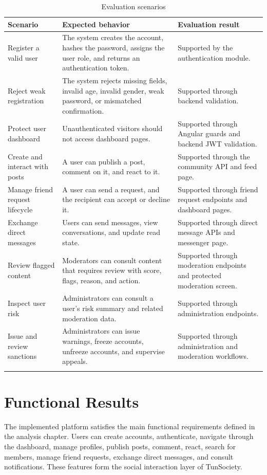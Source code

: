 \begin{longtable}{|m{3.8cm}|m{5.2cm}|m{5.2cm}|}
\hline
\textbf{Scenario} & \textbf{Expected behavior} & \textbf{Evaluation result} \\
\hline
Register a valid user & The system creates the account, hashes the password, assigns the user role, and returns an authentication token. & Supported by the authentication module. \\
\hline
Reject weak registration & The system rejects missing fields, invalid age, invalid gender, weak password, or mismatched confirmation. & Supported through backend validation. \\
\hline
Protect user dashboard & Unauthenticated visitors should not access dashboard pages. & Supported through Angular guards and backend JWT validation. \\
\hline
Create and interact with posts & A user can publish a post, comment on it, and react to it. & Supported through the community API and feed page. \\
\hline
Manage friend request lifecycle & A user can send a request, and the recipient can accept or decline it. & Supported through friend request endpoints and dashboard pages. \\
\hline
Exchange direct messages & Users can send messages, view conversations, and update read state. & Supported through direct message APIs and messenger page. \\
\hline
Review flagged content & Moderators can consult content that requires review with score, flags, reason, and action. & Supported through moderation endpoints and protected moderation screen. \\
\hline
Inspect user risk & Administrators can consult a user's risk summary and related moderation data. & Supported through administration endpoints. \\
\hline
Issue and review sanctions & Administrators can issue warnings, freeze accounts, unfreeze accounts, and supervise appeals. & Supported through administration and moderation workflows. \\
\hline
\caption{Evaluation scenarios}\\
\end{longtable}

\section{Functional Results}

The implemented platform satisfies the main functional requirements defined in the analysis chapter. Users can create accounts, authenticate, navigate through the dashboard, manage profiles, publish posts, comment, react, search for members, manage friend requests, exchange direct messages, and consult notifications. These features form the social interaction layer of TunSociety.

